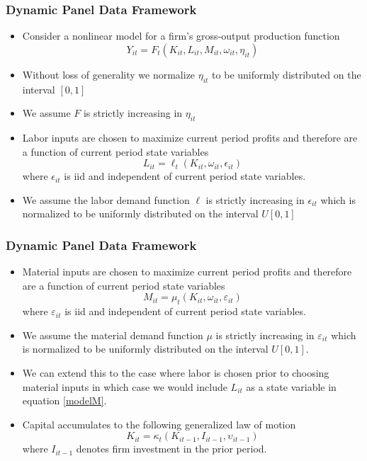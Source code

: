 \documentclass{beamer}
\begin{document}

\begin{frame}
\frametitle{Dynamic Panel Data Framework}
\begin{itemize}
	\item Consider a nonlinear model for a firm's gross-output production function
		\begin{equation}\label{modelY}
			Y_{it}=F_{t}(K_{it}, L_{it}, M_{it}, \omega_{it}, \eta_{it})
		\end{equation}
	\item Without loss of generality we normalize $\eta_{it}$ to be uniformly distributed on the interval $[0,1]$
	\item We assume $F$ is strictly increasing in $\eta_{it}$
	\item Labor inputs are chosen to maximize current period profits and therefore are a function of current period state variables
	\begin{equation} \label{modelL}
		L_{it}=\ell_{t}(K_{it}, \omega_{it}, \epsilon_{it})
	\end{equation}
	where $\epsilon_{it}$ is iid and independent of current period state variables. 
	\item We assume the labor demand function $\ell$ is strictly increasing in $\epsilon_{it}$ which is normalized to be uniformly distributed on the interval $U[0,1]$
\end{itemize}
\end{frame}


\begin{frame}
\frametitle{Dynamic Panel Data Framework}
\begin{itemize}
	\item Material inputs are chosen to maximize current period profits and therefore are a function of current period state variables
		\begin{equation} \label{modelM}
			M_{it}=\mu_{t}(K_{it}, \omega_{it}, \varepsilon_{it})
		\end{equation}
	where $\varepsilon_{it}$ is iid and independent of current period state variables. 
	\item We assume the material demand function $\mu$ is strictly increasing in $\varepsilon_{it}$ which is normalized to be uniformly distributed on the interval $U[0,1]$. 
	\item We can extend this to the case where labor is chosen prior to choosing material inputs in which case we would include $L_{it}$ as a state variable in equation \eqref{modelM}.
	\item Capital accumulates to the following generalized law of motion
		\begin{equation} \label{modelK}
		K_{it}=\kappa_{t}(K_{it-1}, I_{it-1}, \upsilon_{it-1})
		\end{equation}
		where $I_{it-1}$ denotes firm investment in the prior period. 
	\end{itemize}
\end{frame}
\end{document}
